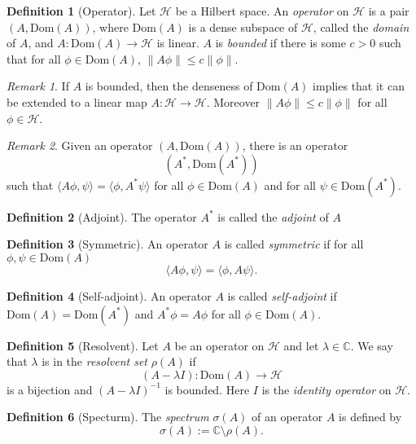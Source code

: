 \documentclass[12pt]{amsart}
\numberwithin{equation}{section}
\theoremstyle{plain}
\theoremstyle{definition}
\newtheorem{defn}{Definition}[subsection]
\theoremstyle{remark}
\newtheorem{rem}{Remark}[subsection]
\newcommand{\calH}{\mathcal{H}}
\begin{document}
\begin{defn}[Operator]
Let $\calH$ be a Hilbert space. An \emph{operator} on $\calH$ is a pair $(A,\mathrm{Dom}(A))$, where $\mathrm{Dom}(A)$ is a dense subspace of $\calH$, called the \emph{domain} of $A$, and $A\colon \mathrm{Dom}(A)\to \calH$ is linear. $A$ is \emph{bounded} if there is some $c>0$ such that for all $\phi\in \mathrm{Dom}(A)$, $\|A\phi\|\leq c\|\phi\|$.
\end{defn}

\begin{rem}
If $A$ is bounded, then the denseness of $\mathrm{Dom}(A)$ implies that it can be extended to a linear map $A\colon \calH\to \calH$. Moreover $\| A\phi\|\leq c\|\phi\|$ for all $\phi\in\calH$.
\end{rem}

\begin{rem}
Given an operator $(A,\mathrm{Dom}(A))$, there is an operator 
\[
(A^*,\mathrm{Dom}(A^*))
\]
such that $\langle  A\phi,\psi\rangle=\langle\phi,A^*\psi\rangle$ for all $\phi\in \mathrm{Dom}(A)$ and for all $\psi\in \mathrm{Dom}(A^*)$.
\end{rem}

\begin{defn}[Adjoint]
The operator $A^*$ is called the \emph{adjoint} of $A$
\end{defn}

\begin{defn}[Symmetric]
An operator $A$ is called \emph{symmetric} if for all $\phi,\psi\in \mathrm{Dom}(A)$
$$\langle A\phi,\psi\rangle=\langle \phi,A\psi\rangle.$$
\end{defn}

\begin{defn}[Self-adjoint]
An operator $A$ is called \emph{self-adjoint} if $\mathrm{Dom}(A)=\mathrm{Dom}(A^*)$ and $A^*\phi=A\phi$ for all $\phi\in \mathrm{Dom}(A)$.
\end{defn}

\begin{defn}[Resolvent]
Let $A$ be an operator on $\calH$ and let $\lambda\in\mathbb{C}$. We say that $\lambda$ is in the \emph{resolvent set} $\rho(A)$ if 
$$(A-\lambda I)\colon \mathrm{Dom}(A)\to \calH$$
is a bijection and $(A-\lambda I)^{-1}$ is bounded. Here $I$ is the \emph{identity operator} on $\calH$.
\end{defn}

\begin{defn}[Specturm]
The \emph{spectrum} $\sigma(A)$ of an operator $A$ is defined by 
\[
\sigma(A):=\mathbb{C}\setminus\rho(A).
\]
\end{defn}
\end{document}
